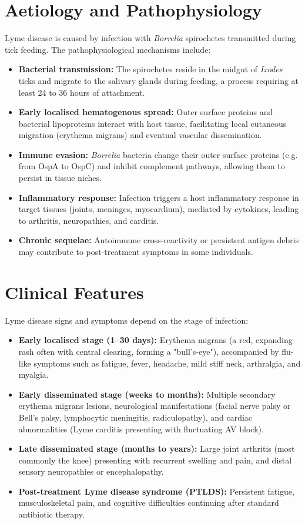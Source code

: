 \section*{Aetiology and Pathophysiology}
Lyme disease is caused by infection with \textit{Borrelia} spirochetes transmitted during tick feeding. The pathophysiological mechanisms include:
\begin{itemize}
    \item \textbf{Bacterial transmission:} The spirochetes reside in the midgut of \textit{Ixodes} ticks and migrate to the salivary glands during feeding, a process requiring at least 24 to 36 hours of attachment.
    \item \textbf{Early localised hematogenous spread:} Outer surface proteins and bacterial lipoproteins interact with host tissue, facilitating local cutaneous migration (erythema migrans) and eventual vascular dissemination.
    \item \textbf{Immune evasion:} \textit{Borrelia} bacteria change their outer surface proteins (e.g. from OspA to OspC) and inhibit complement pathways, allowing them to persist in tissue niches.
    \item \textbf{Inflammatory response:} Infection triggers a host inflammatory response in target tissues (joints, meninges, myocardium), mediated by cytokines, leading to arthritis, neuropathies, and carditis.
    \item \textbf{Chronic sequelae:} Autoimmune cross-reactivity or persistent antigen debris may contribute to post-treatment symptoms in some individuals.
\end{itemize}

\section*{Clinical Features}
Lyme disease signs and symptoms depend on the stage of infection:
\begin{itemize}
    \item \textbf{Early localised stage (1--30 days):} Erythema migrans (a red, expanding rash often with central clearing, forming a "bull's-eye"), accompanied by flu-like symptoms such as fatigue, fever, headache, mild stiff neck, arthralgia, and myalgia.
    \item \textbf{Early disseminated stage (weeks to months):} Multiple secondary erythema migrans lesions, neurological manifestations (facial nerve palsy or Bell's palsy, lymphocytic meningitis, radiculopathy), and cardiac abnormalities (Lyme carditis presenting with fluctuating AV block).
    \item \textbf{Late disseminated stage (months to years):} Large joint arthritis (most commonly the knee) presenting with recurrent swelling and pain, and distal sensory neuropathies or encephalopathy.
    \item \textbf{Post-treatment Lyme disease syndrome (PTLDS):} Persistent fatigue, musculoskeletal pain, and cognitive difficulties continuing after standard antibiotic therapy.
\end{itemize}

